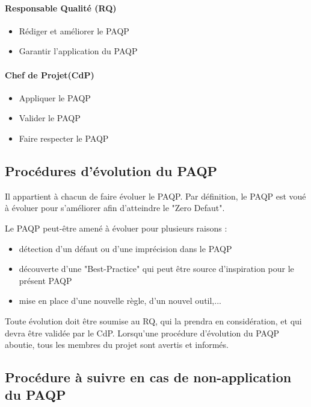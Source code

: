 \paragraph{Responsable Qualité (RQ)\\}
                \begin{itemize}
                \item Rédiger et améliorer le PAQP
                \item Garantir l'application du PAQP
                \end{itemize}	
                
\paragraph{Chef de Projet(CdP)\\} 
                \begin{itemize}
                \item Appliquer le PAQP
                \item Valider le PAQP
                \item Faire respecter le PAQP
                \end{itemize}
    
\subsection{Procédures d’évolution du PAQP}

Il appartient à chacun de faire évoluer le PAQP. Par définition, le PAQP est voué à évoluer pour s'améliorer afin d'atteindre le "Zero Defaut".
\par Le PAQP peut-être amené à évoluer pour plusieurs raisons : 
\begin{itemize}
\item détection d'un défaut ou d'une imprécision dans le PAQP 
\item découverte d'une "Best-Practice" qui peut être source d'inspiration pour le présent PAQP 
\item mise en place d'une nouvelle règle, d'un nouvel outil,...\\
\end{itemize}

Toute évolution doit être soumise au RQ, qui la prendra en considération, et qui devra être validée par le CdP. 
Lorsqu'une procédure d'évolution du PAQP aboutie, tous les membres du projet sont avertis et informés.

\subsection{Procédure à suivre en cas de non-application du PAQP}

